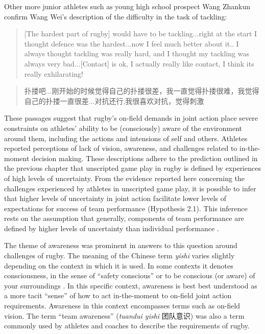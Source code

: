 \begin{CJK}{UTF8}{gbsn}
Other more junior athletes such as young high school prospect Wang Zhankun confirm Wang Wei's description of the difficulty in the task of tackling:

\begin{quote}
  [The hardest part of rugby] would have to be tackling...right at the start I thought defence was the hardest...now I feel much better about it.. I always thought tackling was really hard, and I thought my tackling was always very bad...[Contact] is ok, I actually really like contact, I think its really exhilarating!
\end{quote}

\begin{quote}
  扑搂吧...刚开始的时候觉得自己的扑搂很差，我一直觉得扑搂很难，我觉得自己的扑搂一直很差...对抗还行,我很喜欢对抗，觉得刺激
\end{quote}

These passages suggest that rugby's on-field demands in joint action place severe constraints on athletes' ability to be (consciously) aware of the environment around them, including the actions and intensions of self and others.  Athletes reported perceptions of lack of vision, awareness, and challenges related to in-the-moment decision making.  These descriptions adhere to the prediction outlined in the previous chapter that unscripted game play in rugby is defined by experiences of high levels of uncertainty.  From the evidence reported here concerning the challenges experienced by athletes in unscripted game play, it is possible to infer that higher levels of uncertainty in joint action facilitate lower levels of expectations for success of team performance (Hypothesis 2.1).  This inference rests on the assumption that generally, components of team performance are defined by higher levels of uncertainty than individual performance \citep[see][]{Turvey1978,Fusaroli2014}.


The theme of awareness was prominent in answers to this question around challenges of rugby.  The meaning of the Chinese term \textit{yishi} varies slightly depending on the context in which it is used.  In some contexts it denotes consciousness, in the sense of ``safety conscious'' or to be conscious (or aware) of your surroundings \citep{Pleco2018}.  In this specific context, awareness is best best understood as a more tacit ``sense'' of how to act in-the-moment to on-field joint action requirements.  Awareness in this context encompasses terms such as on-field vision.  The term ``team awareness'' (\textit{tuandui yishi} 团队意识) was also a term commonly used by athletes and coaches to describe the requirements of rugby.


\end{CJK}
